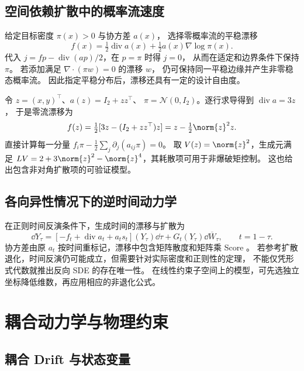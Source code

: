 \subsection{空间依赖扩散中的概率流速度}

给定目标密度 \(\pi(x)>0\) 与协方差 \(a(x)\)，
选择零概率流的平稳漂移
\begin{equation}
 f(x)=\tfrac12\operatorname{div}a(x)+\tfrac12a(x)\nabla\log\pi(x).
 \label{eq:unified-stationary-drift}
\end{equation}
代入 \(j=fp-\operatorname{div}(ap)/2\)，在 \(p=\pi\) 时得 \(j=0\)，
从而在适定和边界条件下保持 \(\pi\)。
若添加满足 \(\nabla\cdot(\pi w)=0\) 的漂移 \(w\)，
仍可保持同一平稳边缘并产生非零稳态概率流。
因此指定平稳分布后，漂移还具有一定的设计自由度。

\begin{example}[二维状态依赖矩阵扩散]
令 \(z=(x,y)^\top\)、\(a(z)=I_2+zz^\top\)、
\(\pi=\mathcal N(0,I_2)\)。逐行求导得到 \(\operatorname{div}a=3z\)，
于是零流漂移为
\[
 f(z)=\tfrac12[3z-(I_2+zz^\top)z]
      =z-\tfrac12\norm{z}^2z.
\]
直接计算每一分量 \(f_i\pi-\frac12\sum_j\partial_j(a_{ij}\pi)=0\)。
取 \(V(z)=\norm{z}^2\)，生成元满足
\(LV=2+3\norm{z}^2-\norm{z}^4\)，其耗散项可用于非爆破矩控制。
这也给出包含非对角扩散项的可验证模型。
\end{example}

\subsection{各向异性情况下的逆时间动力学}

在正则时间反演条件下，生成时间的漂移与扩散为
\begin{equation}
 \dd Y_\tau=[-f_t+\operatorname{div}a_t+a_ts_t](Y_\tau)\dd\tau
                           +G_t(Y_\tau)\dd\overline W_\tau,
 \qquad t=1-\tau.
 \label{eq:unified-anisotropic-reverse}
\end{equation}
协方差由原 \(a_t\) 按时间重标记，漂移中包含矩阵散度和矩阵乘 Score
\cite{haussmann1986time}。
若参考扩散退化，时间反演仍可能成立，但需要针对实际密度和正则性的定理，
不能仅凭形式代数就推出反向 SDE 的存在唯一性。
在线性约束子空间上的模型，可先选独立坐标降低维数，再应用相应的非退化公式。

\section{耦合动力学与物理约束}
\label{sec:unified-coupled}

\subsection{耦合 Drift 与状态变量}

